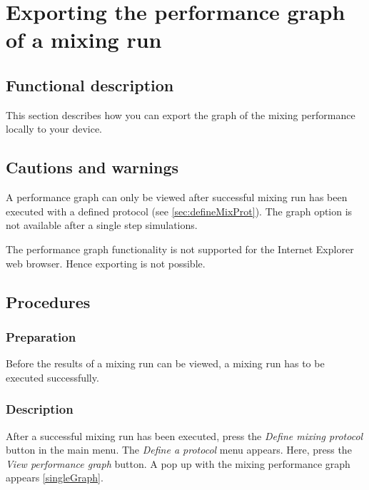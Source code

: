 

\section{Exporting the performance graph of a mixing run}
\label{sec:exportSingleGraph}

\subsection{Functional description}
This section describes how you can export the graph of the mixing performance locally to your device.

\subsection{Cautions and warnings}
A performance graph can only be viewed after successful mixing run has been executed with a defined protocol (see \ref{sec:defineMixProt}). The graph option is not available after a single step simulations.

The performance graph functionality is not supported for the Internet Explorer web browser. Hence exporting is not possible.

\subsection{Procedures}
\subsubsection{Preparation}
Before the results of a mixing run can be viewed, a mixing run has to be executed successfully.

\subsubsection{Description}
After a successful mixing run has been executed, press the \emph{Define mixing protocol} button in the main menu. The \emph{Define a protocol} menu appears. Here, press the \emph{View performance graph} button. A pop up with the mixing performance graph appears \ref{singleGraph}.

